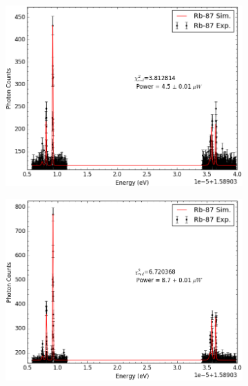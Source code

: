 \begin{figure}[h]
    \centering
    \begin{subfigure}[b]{0.49\textwidth}
        \includegraphics[width=\textwidth]{Graphics/100_101.png}
        \caption{}
    \end{subfigure}
    \begin{subfigure}[b]{0.49\textwidth}
        \includegraphics[width=\textwidth]{Graphics/098_099.png}
        \caption{}
        \label{}
    \end{subfigure}
    

\end{figure}
